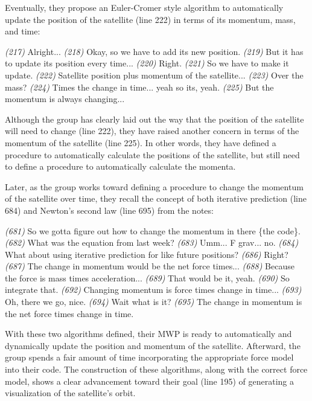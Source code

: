 \documentclass{msuphddissertation}
\begin{document}
\begin{doublespace}
Eventually, they propose an Euler-Cromer style algorithm to automatically update the position of the satellite (line 222) in terms of its momentum, mass, and time:
\begin{description}
\SB \textit{(217)} Alright...
\SB \textit{(218)} Okay, so we have to add its {new} position.
\SA \textit{(219)} But it has to update its position every time...
\SB \textit{(220)} Right.
\SA \textit{(221)} So we have to make it update.
\SB \textit{(222)} Satellite position plus momentum of the satellite...
\SA \textit{(223)} Over the mass?			
\SB \textit{(224)} Times the change in time... yeah so its, yeah.
\SB \textit{(225)} But the momentum is always changing...
\end{description}  Although the group has clearly laid out the way that the position of the satellite will need to change (line 222), they have raised another concern in terms of the momentum of the satellite (line 225).  In other words, they have defined a procedure to automatically calculate the positions of the satellite, but still need to define a procedure to automatically calculate the momenta.

Later, as the group works toward defining a procedure to change the momentum of the satellite over time, they recall the concept of both iterative prediction (line 684) and Newton's second law (line 695) from the notes:
\begin{description}
\SB \textit{(681)} So we gotta figure out how to change the momentum in there \{the code\}.
\SB \textit{(682)} What was the equation from last week?		
\SA \textit{(683)} Umm... F grav... no.
\SD \textit{(684)} What about using iterative prediction for like future positions?
\SD \textit{(686)} Right?
\SC \textit{(687)} The change in momentum would be the net force times...	
\SB \textit{(688)} Because the force is mass times acceleration...
\SC \textit{(689)} That would be it, yeah.
\SB \textit{(690)} So integrate that.
\SC \textit{(692)} Changing momentum is force times change in time...
\SB \textit{(693)} Oh, there we go, nice.
\SA \textit{(694)} Wait what is it?
\SB \textit{(695)} The change in momentum is the net force times change in time.
\end{description}  With these two algorithms defined, their MWP is ready to automatically and dynamically update the position and momentum of the satellite.  Afterward, the group spends a fair amount of time incorporating the appropriate force model into their code.  The construction of these algorithms, along with the correct force model, shows a clear advancement toward their goal (line 195) of generating a visualization of the satellite's orbit.


\end{doublespace}
\end{document}
